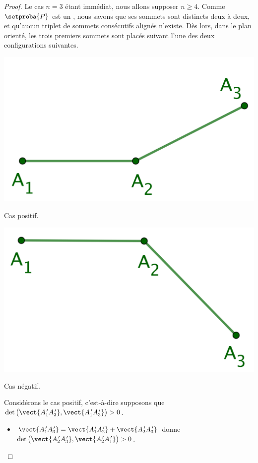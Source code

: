 \begin{proof}
    Le cas $n = 3$ étant immédiat, nous allons supposer $n \geq 4$. 
    Comme $\setproba{P}$ est un \ngone, nous savons que ses sommets sont distincts deux à deux, et qu'aucun triplet de sommets consécutifs alignés n'existe. 
    Dès lors, dans le plan orienté, les trois premiers sommets sont placés suivant l'une des deux configurations suivantes. 
    
    \begin{multicols}{2}
    	\small\itshape\centering
    	\includegraphics[scale=.45]{content/polygon/at-least-one/conv-det-sign-1.png}
	    
	    \smallskip
	    Cas positif.
    
    	\includegraphics[scale=.45]{content/polygon/at-least-one/conv-det-sign-2.png}
	    
	    \smallskip
	    Cas négatif.
    \end{multicols}

    
    Considérons le cas positif, c'est-à-dire supposons que 
    $\det \big( \vect{A^{\,\prime}_1 A^{\,\prime}_2}, \vect{A^{\,\prime}_1 A^{\,\prime}_3} \big) > 0$.
	\begin{itemize}
		\item $\vect{A^{\,\prime}_1 A^{\,\prime}_3} = \vect{A^{\,\prime}_1 A^{\,\prime}_2} + \vect{A^{\,\prime}_2 A^{\,\prime}_3}$
		donne
		$\det \big( \vect{A^{\,\prime}_2 A^{\,\prime}_3}, \vect{A^{\,\prime}_2 A^{\,\prime}_1} \big) > 0$.



\end{itemize}
\end{proof}
